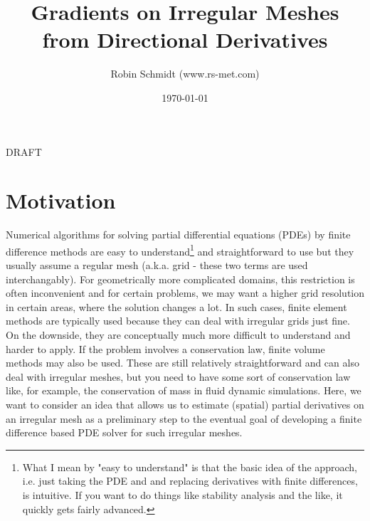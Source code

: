 \title{Gradients on Irregular Meshes from Directional Derivatives}
\author{Robin Schmidt (www.rs-met.com)}
\date{\today}
\maketitle

DRAFT

\section{Motivation}
Numerical algorithms for solving partial differential equations (PDEs) by finite difference methods are easy to understand\footnote{What I mean by "easy to understand" is that the basic idea of the approach, i.e. just taking the PDE and and replacing derivatives with finite differences, is intuitive. If you want to do things like stability analysis and the like, it quickly gets fairly advanced.} and straightforward to use but they usually assume a regular mesh (a.k.a. grid - these two terms are used interchangably). For geometrically more complicated domains, this restriction is often inconvenient and for certain problems, we may want a higher grid resolution in certain areas, where the solution changes a lot. In such cases, finite element methods are typically used because they can deal with irregular grids just fine. On the downside, they are conceptually much more difficult to understand and harder to apply. If the problem involves a conservation law, finite volume methods may also be used. These are still relatively straightforward and can also deal with irregular meshes, but you need to have some sort of conservation law like, for example, the conservation of mass in fluid dynamic simulations. Here, we want to consider an idea that allows us to estimate (spatial) partial derivatives on an irregular mesh as a preliminary step to the eventual goal of developing a finite difference based PDE solver for such irregular meshes.




